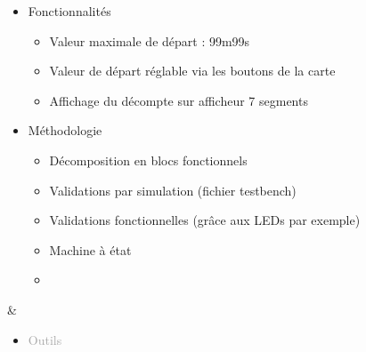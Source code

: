 \documentclass{article}
\begin{document}
\begin{tabular}
\begin{itemize}
\begin{itemize}
            \item \textcolor{gray!100}{Fonctionnalités}
            \begin{itemize}
                [label={\textcolor{gray!100}{$\triangleright$}}, topsep=0pt, partopsep=0pt, itemsep=0.5pt, parsep=2pt]
                \item \textcolor{gray!100}{Valeur maximale de départ : 99m99s}
                \item \textcolor{gray!100}{Valeur de départ réglable via les boutons de la carte}
                \item \textcolor{gray!100}{Affichage du décompte sur afficheur 7 segments}
            \end{itemize}
            \item \textcolor{gray!100}{Méthodologie}       
            \begin{itemize}
                [label={\textcolor{gray!100}{$\triangleright$}}, topsep=0pt, partopsep=0pt, itemsep=0.5pt, parsep=2pt]
                \item \textcolor{gray!100}{Décomposition en blocs fonctionnels}
                \item \textcolor{gray!100}{Validations par simulation (fichier testbench)}
                \item \textcolor{gray!100}{Validations fonctionnelles (grâce aux LEDs par exemple)}
                \item \textcolor{gray!100}{Machine à état}
                \item[\textcolor{white}{}] {} %
            \end{itemize}
        \end{itemize}
    \end{itemize}
    &
    \begin{itemize}
        [label={}, topsep=8pt, partopsep=0pt, itemsep=0.5pt, parsep=2pt,after=\vspace*{-\baselineskip}]
        \setlength{\itemsep}{10pt}
        \item \textcolor{darkGray}{Outils}
        \begin{itemize}
        [label={\textcolor{gray!100}{\checkmark}}, topsep=8pt, partopsep=0pt, itemsep=0.5pt, parsep=2pt,after=\vspace*{-\baselineskip}] 
            

\end{itemize}
\end{itemize}
\end{tabular}
\end{document}
